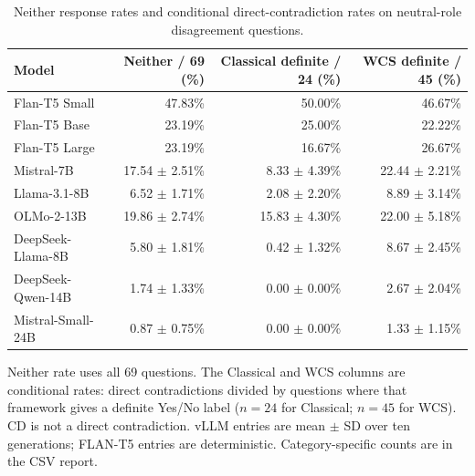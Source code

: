 \begin{table}[htbp]
\centering
\scriptsize
\setlength{\tabcolsep}{5pt}
\caption{Neither response rates and conditional direct-contradiction rates on neutral-role disagreement questions.}
\label{tab:neither-direct-contradictions}
\begin{tabular}{lrrr}
\toprule
Model & Neither / 69 (\%) & Classical definite / 24 (\%) & WCS definite / 45 (\%) \\
\midrule
Flan-T5 Small & 47.83\% & 50.00\% & 46.67\% \\
Flan-T5 Base & 23.19\% & 25.00\% & 22.22\% \\
Flan-T5 Large & 23.19\% & 16.67\% & 26.67\% \\
Mistral-7B & 17.54 $\pm$ 2.51\% & 8.33 $\pm$ 4.39\% & 22.44 $\pm$ 2.21\% \\
Llama-3.1-8B & 6.52 $\pm$ 1.71\% & 2.08 $\pm$ 2.20\% & 8.89 $\pm$ 3.14\% \\
OLMo-2-13B & 19.86 $\pm$ 2.74\% & 15.83 $\pm$ 4.30\% & 22.00 $\pm$ 5.18\% \\
DeepSeek-Llama-8B & 5.80 $\pm$ 1.81\% & 0.42 $\pm$ 1.32\% & 8.67 $\pm$ 2.45\% \\
DeepSeek-Qwen-14B & 1.74 $\pm$ 1.33\% & 0.00 $\pm$ 0.00\% & 2.67 $\pm$ 2.04\% \\
Mistral-Small-24B & 0.87 $\pm$ 0.75\% & 0.00 $\pm$ 0.00\% & 1.33 $\pm$ 1.15\% \\
\bottomrule
\end{tabular}
\vspace{2pt}
\begin{minipage}{\linewidth}
\scriptsize Neither rate uses all 69 questions. The Classical and WCS columns are conditional rates: direct contradictions divided by questions where that framework gives a definite Yes/No label ($n=24$ for Classical; $n=45$ for WCS). CD is not a direct contradiction. vLLM entries are mean $\pm$ SD over ten generations; FLAN-T5 entries are deterministic. Category-specific counts are in the CSV report.
\end{minipage}
\end{table}
